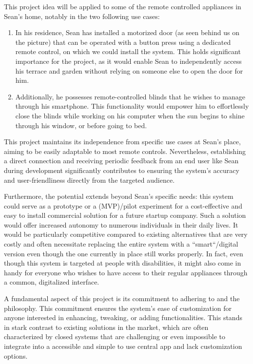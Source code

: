 This project idea will be applied to some of the remote controlled appliances in Sean's home, notably in the two following use cases:
\begin{enumerate}
    \item In his residence, Sean has installed a motorized door (as seen behind us on the picture) that can be operated with a button press using a dedicated remote control, on which we could install the system.
        This holds significant importance for the project, as it would enable Sean to independently access his terrace and garden without relying on someone else to open the door for him.
    \item Additionally, he possesses remote-controlled blinds that he wishes to manage through his smartphone.
        This functionality would empower him to effortlessly close the blinds while working on his computer when the sun begins to shine through his window, or before going to bed.
\end{enumerate}

This project maintains its independence from specific use cases at Sean's place, aiming to be easily adaptable to most remote controls.
Nevertheless, establishing a direct connection and receiving periodic feedback from an end user like Sean during development significantly contributes to ensuring the system's accuracy and user-friendliness directly from the targeted audience.

Furthermore, the potential extends beyond Sean's specific needs: this system could serve as a prototype or a  (MVP)/pilot experiment for a cost-effective and easy to install commercial solution for a future startup company.
Such a solution would offer increased autonomy to numerous individuals in their daily lives.
It would be particularly competitive compared to existing alternatives that are very costly and often necessitate replacing the entire system with a ``smart``/digital version even though the one currently in place still works properly.
In fact, even though this system is targeted at people with disabilities, it might also come in handy for everyone who wishes to have access to their regular appliances through a common, digitalized interface.

A fundamental aspect of this project is its commitment to adhering to  and the  philosophy.
This commitment ensures the system's ease of customization for anyone interested in enhancing, tweaking, or adding functionalities.
This stands in stark contrast to existing solutions in the market, which are often characterized by closed systems that are challenging or even impossible to integrate into a accessible and simple to use central app and lack customization options.

